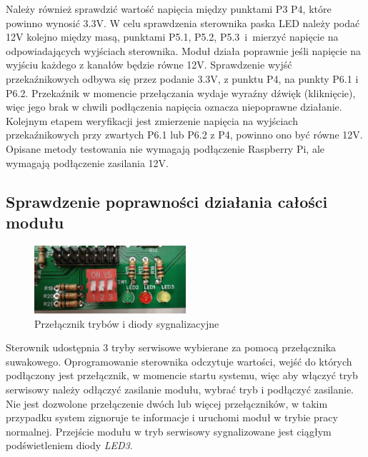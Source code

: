 \documentclass[12pt, eng, twoside, openany, final]{mgr}
\begin{document}
            Należy również sprawdzić wartość napięcia między punktami P3 P4, które powinno wynosić 3.3V.
            W celu sprawdzenia sterownika paska LED należy podać 12V kolejno między masą, punktami P5.1, P5.2, P5.3~i~mierzyć napięcie na odpowiadających wyjściach sterownika. Moduł działa poprawnie jeśli napięcie na wyjściu każdego z kanałów będzie równe 12V.
            Sprawdzenie wyjść przekaźnikowych odbywa się przez podanie 3.3V, z punktu P4, na punkty P6.1 i P6.2.
            Przekaźnik w momencie przełączania wydaje wyraźny dźwięk (kliknięcie), więc jego brak w chwili podłączenia napięcia oznacza niepoprawne działanie. Kolejnym etapem weryfikacji jest zmierzenie napięcia na wyjściach przekaźnikowych przy zwartych P6.1 lub P6.2 z P4, powinno ono być równe 12V. Opisane metody testowania nie wymagają podłączenie Raspberry Pi, ale wymagają podłączenie zasilania 12V. 
            
            \subsection{Sprawdzenie poprawności działania całości modułu}
                \begin{figure}[H]
                \begin{center}
                    \includegraphics[width=0.5\textwidth]{dip_zoom.jpg}
                    \caption{Przełącznik trybów i diody sygnalizacyjne}
                \end{center}
                \end{figure}
            Sterownik udostępnia 3 tryby serwisowe wybierane za pomocą przełącznika suwakowego.
            Oprogramowanie sterownika odczytuje wartości, wejść do których podłączony jest przełącznik, w momencie startu systemu, więc aby włączyć tryb serwisowy należy odłączyć zasilanie modułu, wybrać tryb i podłączyć zasilanie. Nie jest dozwolone przełączenie dwóch lub więcej przełączników, w takim przypadku system zignoruje te informacje i uruchomi moduł w trybie pracy normalnej. Przejście modułu w tryb serwisowy sygnalizowane jest ciągłym podświetleniem diody \emph{LED3}.
            
\end{document}
